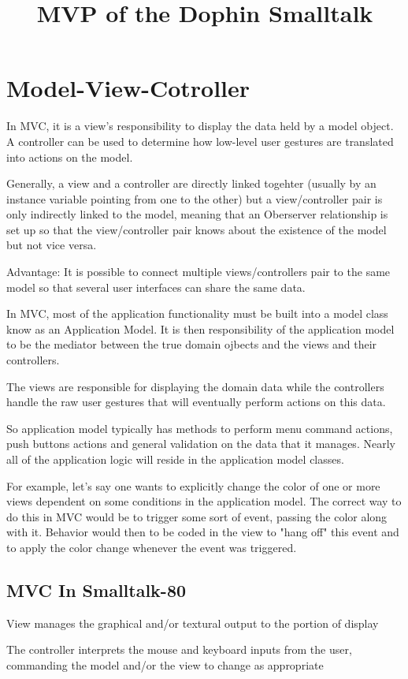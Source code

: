 \documentclass[a4paper, 11pt]{book}
\title{MVP of the Dophin Smalltalk}
\begin{document}
\chapter{Model-View-Cotroller}
In MVC, it is a view's responsibility to display the data held by a model
object. A controller can be used to determine how low-level user gestures are
translated into actions on the model.

Generally, a view and a controller are directly linked togehter (usually by an
instance variable pointing from one to the other) but a view/controller pair is
only indirectly linked to the model, meaning that an Oberserver relationship is
set up so that the view/controller pair knows about the existence of the model
but not vice versa.

Advantage: It is possible to connect multiple views/controllers pair to the same
model so that several user interfaces can share the same data.

In MVC, most of the application functionality must be built into a model class
know as an Application Model. It is then responsibility of the application model
to be the mediator between the true domain ojbects and the views and their
controllers.

The views are responsible for displaying the domain data while the controllers
handle the raw user gestures that will eventually perform actions on this data. 

So application model typically has methods to perform menu command actions, push
buttons actions and general validation on the data that it manages. Nearly all
of the application logic will reside in the application model classes.

For example, let's say one wants to explicitly change the color of one or more
views dependent on some conditions in the application model. The correct way to
do this in MVC would be to trigger some sort of event, passing the color along
with it. Behavior would then to be coded in the view to "hang off" this event
and to apply the color change whenever the event was triggered. 

\section{MVC In Smalltalk-80}
View manages the graphical and/or textural output to the portion of display

The controller interprets the mouse and keyboard inputs from the user,
commanding the model and/or the view to change as appropriate
\end{document}
